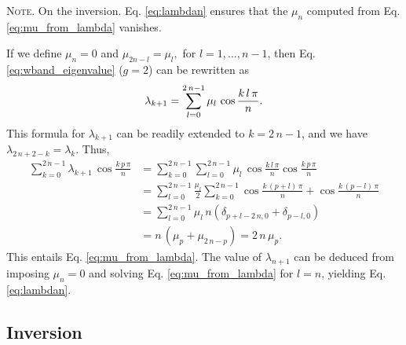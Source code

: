 \documentclass[reprint, superscriptaddress, floatfix]{revtex4-1}
\newcommand{\note}[1]{{\color{DarkGreen}\footnotesize \textsc{Note.} #1}}
\begin{document}
\note{On the inversion.
Eq. \eqref{eq:lambdan}
  ensures that the $\mu_n$
  computed from Eq. \eqref{eq:mu_from_lambda}
  vanishes.

  If we define $\mu_n = 0$ and
  $
    \mu_{ 2 n - l } = \mu_l,
  $
  for
  $l = 1, \dots, n - 1$,
  then Eq. \eqref{eq:wband_eigenvalue} ($g = 2$)
  can be rewritten as
  \begin{align}
    \lambda_{k+1}
    =
    \sum_{ l = 0 }^{ 2 \, n - 1 }
    \mu_l \, \cos \frac{ k \, l \, \pi } { n }.
  \notag
  \end{align}
  This formula for $\lambda_{k+1}$
  can be readily extended to $k = 2 \, n - 1$,
  and we have
  $
    \lambda_{ 2 \, n + 2 - k } = \lambda_k
    .
  $
  Thus,
  $$
  \begin{aligned}
    \sum_{ k = 0 }^{ 2 \, n - 1 }
      \lambda_{ k + 1 } \,
      \cos \frac{ k \, p \, \pi }
                {      n        }
    &=
    \sum_{ k = 0 }^{ 2 \, n - 1 }
      \sum_{ l = 0 }^{ 2 \, n - 1 }
        \mu_l \,
        \cos \frac{ k \, l \, \pi }
                  {      n        }
        \cos \frac{ k \, p \, \pi }
                  {      n        }
    \\
    &=
    \sum_{ l = 0 }^{ 2 \, n - 1 }
      \frac{ \mu_l } { 2 }
      \sum_{ k = 0 }^{ 2 \, n - 1 }
        \cos \frac{ k \, (p + l) \, \pi }
                  {      n        }
                  +
        \cos \frac{ k \, (p - l) \, \pi }
                  {      n        }
    \\
    &=
    \sum_{ l = 0 }^{ 2 \, n - 1 }
      \mu_l \, n \left(
        \delta_{ p + l - 2 \, n, 0 }
        +
        \delta_{ p - l, 0 }
      \right)
    \\
    &=
    n \, \left( \mu_p + \mu_{ 2 \, n - p} \right)
    =
    2 \, n \, \mu_p.
  \end{aligned}
  $$
  This entails Eq. \eqref{eq:mu_from_lambda}.
  The value of $\lambda_{n + 1}$
  can be deduced from
  imposing $\mu_n = 0$
  and solving Eq. \eqref{eq:mu_from_lambda}
  for $l = n$,
  yielding Eq. \eqref{eq:lambdan}.
}


\subsection{\label{sec:invert_wband}
Inversion}
\end{document}
